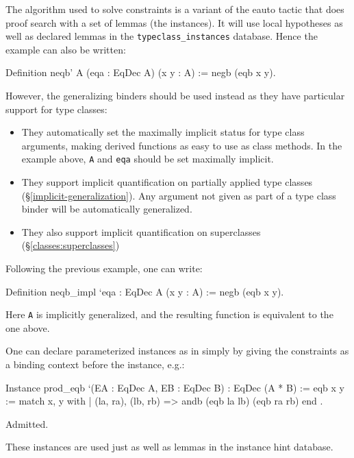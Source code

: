The algorithm used to solve constraints is a variant of the eauto tactic
that does proof search with a set of lemmas (the instances). It will use
local hypotheses as well as declared lemmas in the
\texttt{typeclass\_instances} database. Hence the example can also be
written:

\begin{coq_example}
Definition neqb' A (eqa : EqDec A) (x y : A) := negb (eqb x y).
\end{coq_example}

However, the generalizing binders should be used instead as they have
particular support for type classes:
\begin{itemize}
\item They automatically set the maximally implicit status for type
  class arguments, making derived functions as easy to use as class
  methods. In the example above, \texttt{A} and \texttt{eqa} should be
  set maximally implicit.
\item They support implicit quantification on partially applied type
  classes (\S \ref{implicit-generalization}).
  Any argument not given as part of a type class binder will be
  automatically generalized.
\item They also support implicit quantification on superclasses
  (\S \ref{classes:superclasses})
\end{itemize}

Following the previous example, one can write:
\begin{coq_example}
Definition neqb_impl `{eqa : EqDec A} (x y : A) := negb (eqb x y).
\end{coq_example}

Here \texttt{A} is implicitly generalized, and the resulting function
is equivalent to the one above.


One can declare parameterized instances as in \Haskell simply by giving
the constraints as a binding context before the instance, e.g.:

\begin{coq_example}
Instance prod_eqb `(EA : EqDec A, EB : EqDec B) : EqDec (A * B) :=
{ eqb x y := match x, y with
  | (la, ra), (lb, rb) => andb (eqb la lb) (eqb ra rb)
  end }.
\end{coq_example}
\begin{coq_eval}
Admitted.
\end{coq_eval}

These instances are used just as well as lemmas in the instance hint database.


